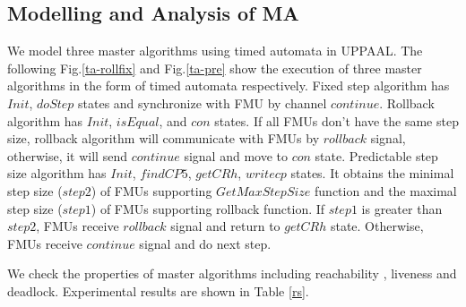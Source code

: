 \subsection{Modelling and Analysis of MA} 
We model three master algorithms using timed automata in UPPAAL. The following Fig.\ref{ta-rollfix} and Fig.\ref{ta-pre} show the execution of three master algorithms in the form of timed automata respectively. Fixed step algorithm has $Init$, $doStep$ states and synchronize with FMU by channel $continue$. Rollback algorithm has $Init$, $isEqual$, and $con$ states. If all FMUs don't have the same step size, rollback algorithm will communicate with FMUs by $rollback$ signal, otherwise, it will send $continue$ signal and move to $con$ state. Predictable step size algorithm has $Init$, $findCP5$, $getCRh$, $writecp$ states. It obtains the minimal step size ($step2$) of FMUs supporting $GetMaxStepSize$ function and the maximal step size ($step1$) of FMUs supporting rollback function. If $step1$ is greater than $step2$, FMUs receive $rollback$ signal and return to $getCRh$ state. Otherwise, FMUs receive $continue$ signal and do next step.  
\begin{figure}[htbp]
\end{figure}
We check the properties of master algorithms including reachability , liveness and deadlock. Experimental results are shown in Table \ref{rs}.


